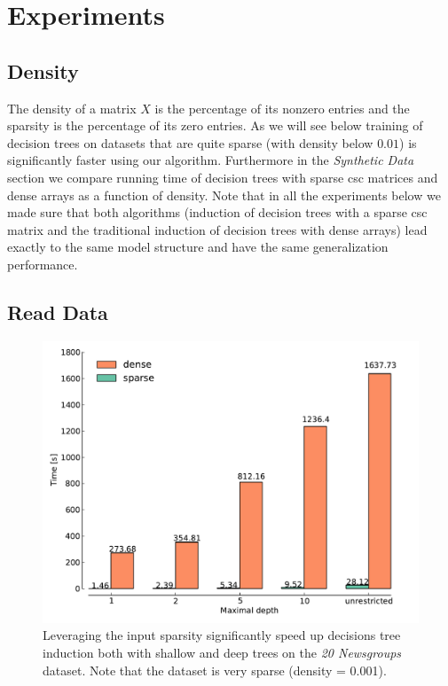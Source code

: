 \section{Experiments} \label{sec:experiments}

\subsection{Density}
The density of a matrix $X$ is the percentage of its nonzero entries and the sparsity is the percentage of its zero entries. As we will see below training of decision trees on datasets that are quite sparse (with density below $0.01$) is significantly faster using our algorithm. Furthermore in the \emph{Synthetic Data} section we compare running time of decision trees with sparse csc matrices and dense arrays as a function of density. Note that in all the experiments below we made sure that both algorithms (induction of decision trees with a sparse csc matrix and the traditional induction of decision trees with dense arrays) lead exactly to the same model structure and have the same generalization performance.

\subsection{Read Data}

\begin{figure}[h]
\centering
\includegraphics[scale=0.45]{images/20news.pdf}
\caption{Leveraging the input sparsity significantly speed up decisions
         tree induction both with shallow and deep trees on the \emph{20 Newsgroups}
         dataset. Note that the dataset is very sparse (density = 0.001).}
\label{fig:20news}
\end{figure}

